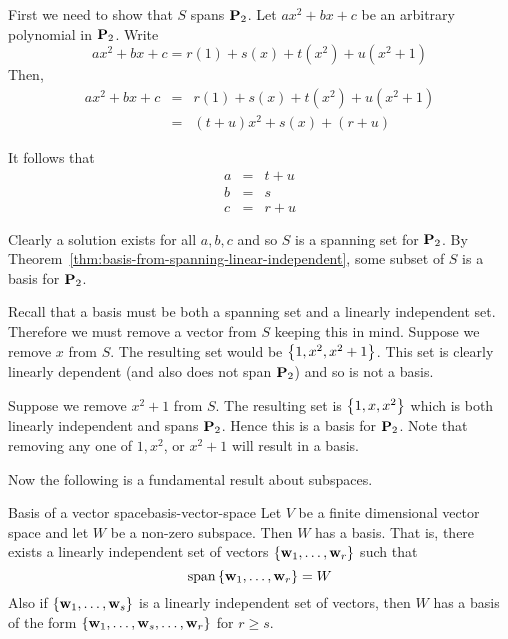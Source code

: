 \begin{solution}
First we need to show that $S$ spans $\mathbf{P}_2$. Let $ax^2 + bx + c$ be an arbitrary polynomial in $\mathbf{P}_2$. Write
\[
ax^2 + bx + c = r(1) + s(x) + t(x^2) + u (x^2 + 1)
\]
Then,
\begin{eqnarray*}
ax^2 +bx + c &=& r(1) + s(x) + t(x^2) + u (x^2 + 1) \\
&=& (t+u) x^2 + s(x) + (r+u)
\end{eqnarray*}

It follows that
\begin{eqnarray*}
a &=& t + u \\
b &=& s \\
c &=& r + u
\end{eqnarray*}

Clearly a solution exists for all $a,b,c$ and so $S$ is a spanning set for $\mathbf{P}_2$. By Theorem~\ref{thm:basis-from-spanning-linear-independent}, some subset of $S$ is a basis for $\mathbf{P}_2$.

Recall that a basis must be both a spanning set and a linearly independent set.
Therefore we must remove a vector from $S$ keeping this in mind. Suppose we remove $x$ from $S$. The resulting set would be $\left\{1, x^2, x^2 + 1 \right\}$. This set is clearly linearly dependent (and also does not span $\mathbf{P}_2$) and so is not a basis.

Suppose we remove $x^2 + 1$ from $S$. The resulting set is $\left\{1, x, x^2 \right\}$ which is both linearly independent and spans $\mathbf{P}_2$. Hence this is a basis for $\mathbf{P}_2$. Note that removing any one of $1, x^2$, or $x^2 + 1$ will result in a basis.
\end{solution}

Now the following is a fundamental result about subspaces.

\begin{theorem}{Basis of a vector space}{basis-vector-space}
Let $V$ be a finite dimensional vector space and let $W$ be
a non-zero subspace. Then $W$ has a basis. That is, there exists a linearly
independent set of vectors $\left\{\mbox{\bf w}_{1},\ldots,\mbox{\bf w}_{r}\right\} $
such that
\begin{equation*}
\sspan\set{\vect{w}_{1},\ldots,\vect{w}_{r}} =W
\end{equation*}
Also if $\left\{\mbox{\bf w}_{1},\ldots,\mbox{\bf w}_{s}\right\} $ is a linearly
independent set of vectors, then $W$ has a basis of the form $\left\{\mbox{\bf w}
_{1},\ldots,\mbox{\bf w}_{s},\ldots,\mbox{\bf w}_{r}\right\} $ for $r\geq s$.
\end{theorem}

